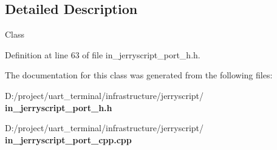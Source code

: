 \subsection{Detailed Description}
Class 

Definition at line 63 of file in\+\_\+jerryscript\+\_\+port\+\_\+h.\+h.



The documentation for this class was generated from the following files\+:\begin{DoxyCompactItemize}
\item 
D\+:/project/uart\+\_\+terminal/infrastructure/jerryscript/\textbf{ in\+\_\+jerryscript\+\_\+port\+\_\+h.\+h}\item 
D\+:/project/uart\+\_\+terminal/infrastructure/jerryscript/\textbf{ in\+\_\+jerryscript\+\_\+port\+\_\+cpp.\+cpp}\end{DoxyCompactItemize}
